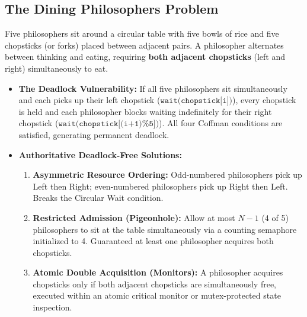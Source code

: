 \subsection{The Dining Philosophers Problem}
Five philosophers sit around a circular table with five bowls of rice and five chopsticks (or forks) placed between adjacent pairs. A philosopher alternates between thinking and eating, requiring \textbf{both adjacent chopsticks} (left and right) simultaneously to eat.
\begin{itemize}
    \item \textbf{The Deadlock Vulnerability:} If all five philosophers sit simultaneously and each picks up their left chopstick ($\texttt{wait(chopstick[i])}$), every chopstick is held and each philosopher blocks waiting indefinitely for their right chopstick ($\texttt{wait(chopstick[(i+1)\%5])}$). All four Coffman conditions are satisfied, generating permanent deadlock.
    \item \textbf{Authoritative Deadlock-Free Solutions:}
    \begin{enumerate}
        \item \textbf{Asymmetric Resource Ordering:} Odd-numbered philosophers pick up Left then Right; even-numbered philosophers pick up Right then Left. Breaks the Circular Wait condition.
        \item \textbf{Restricted Admission (Pigeonhole):} Allow at most $N-1$ (4 of 5) philosophers to sit at the table simultaneously via a counting semaphore initialized to 4. Guaranteed at least one philosopher acquires both chopsticks.
        \item \textbf{Atomic Double Acquisition (Monitors):} A philosopher acquires chopsticks only if both adjacent chopsticks are simultaneously free, executed within an atomic critical monitor or mutex-protected state inspection.
    \end{enumerate}
\end{itemize}

